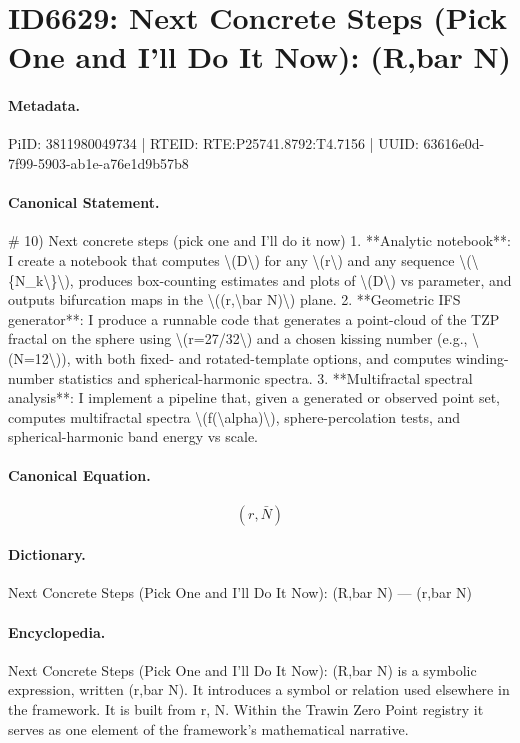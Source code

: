 \section*{ID6629: Next Concrete Steps (Pick One and I’ll Do It Now): (R,bar N)}
\paragraph{Metadata.}
PiID: 3811980049734 | RTEID: RTE:P25741.8792:T4.7156 | UUID: 63616e0d-7f99-5903-ab1e-a76e1d9b57b8

\paragraph{Canonical Statement.}
\# 10) Next concrete steps (pick one and I’ll do it now) 1. **Analytic notebook**: I create a notebook that computes \textbackslash{}(D\textbackslash{}) for any \textbackslash{}(r\textbackslash{}) and any sequence \textbackslash{}(\textbackslash{}\{N\_k\textbackslash{}\}\textbackslash{}), produces box-counting estimates and plots of \textbackslash{}(D\textbackslash{}) vs parameter, and outputs bifurcation maps in the \textbackslash{}((r,\textbackslash{}bar N)\textbackslash{}) plane. 2. **Geometric IFS generator**: I produce a runnable code that generates a point-cloud of the TZP fractal on the sphere using \textbackslash{}(r=27/32\textbackslash{}) and a chosen kissing number (e.g., \textbackslash{}(N=12\textbackslash{})), with both fixed- and rotated-template options, and computes winding-number statistics and spherical-harmonic spectra. 3. **Multifractal spectral analysis**: I implement a pipeline that, given a generated or observed point set, computes multifractal spectra \textbackslash{}(f(\textbackslash{}alpha)\textbackslash{}), sphere-percolation tests, and spherical-harmonic band energy vs scale.

\paragraph{Canonical Equation.}
\[
(r,\bar N)
\]

\paragraph{Dictionary.}
Next Concrete Steps (Pick One and I’ll Do It Now): (R,bar N) — (r,bar N)

\paragraph{Encyclopedia.}
Next Concrete Steps (Pick One and I’ll Do It Now): (R,bar N) is a symbolic expression, written (r,bar N). It introduces a symbol or relation used elsewhere in the framework. It is built from r, N. Within the Trawin Zero Point registry it serves as one element of the framework's mathematical narrative.
